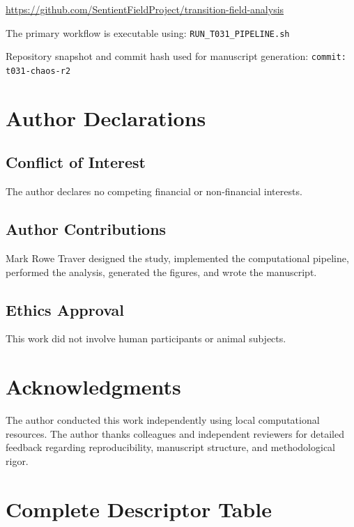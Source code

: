 \documentclass[%
 aip,
 chaos,
 amsmath,amssymb,
 reprint,
]{revtex4-2}
\begin{document}
\url{https://github.com/SentientFieldProject/transition-field-analysis}

The primary workflow is executable using:
\texttt{RUN\_T031\_PIPELINE.sh}

Repository snapshot and commit hash used for manuscript generation:
\texttt{commit: t031-chaos-r2}

\section{Author Declarations}

\subsection{Conflict of Interest}

The author declares no competing financial or non-financial interests.

\subsection{Author Contributions}

Mark Rowe Traver designed the study, implemented the computational pipeline, performed the analysis, generated the figures, and wrote the manuscript.

\subsection{Ethics Approval}

This work did not involve human participants or animal subjects.

\section{Acknowledgments}

The author conducted this work independently using local computational resources. The author thanks colleagues and independent reviewers for detailed feedback regarding reproducibility, manuscript structure, and methodological rigor.

\appendix
\section{Complete Descriptor Table}
\label{app:descriptors}
\end{document}

